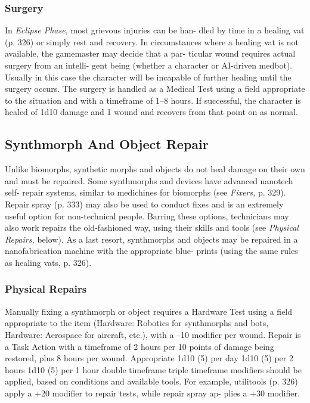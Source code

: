 \subsubsection{Surgery}

In \textit{Eclipse Phase,} most grievous injuries can be han-
dled by time in a healing vat (p. 326) or simply rest 
and recovery. In circumstances where a healing vat is 
not available, the gamemaster may decide that a par-
ticular wound requires actual surgery from an intelli-
gent being (whether a character or AI-driven medbot). 
Usually in this case the character will be incapable of 
further healing until the surgery occurs. The surgery 
is handled as a Medical Test using a field appropriate 
to the situation and with a timeframe of 1–8 hours. If 
successful, the character is healed of 1d10 damage and 
1 wound and recovers from that point on as normal.

\subsection{Synthmorph And Object Repair}

Unlike biomorphs, synthetic morphs and objects do not 
heal damage on their own and must be repaired. Some 
synthmorphs and devices have advanced nanotech self-
repair systems, similar to medichines for biomorphs (see 
\textit{Fixers,} p. 329). Repair spray (p. 333) may also be used 
to conduct fixes and is an extremely useful option for 
non-technical people. Barring these options, technicians 
may also work repairs the old-fashioned way, using 
their skills and tools (see \textit{Physical Repairs,} below). As a 
last resort, synthmorphs and objects may be repaired in 
a nanofabrication machine with the appropriate blue-
prints (using the same rules as healing vats, p. 326).

\subsubsection{Physical Repairs}

Manually fixing a synthmorph or object requires a 
Hardware Test using a field appropriate to the item 
(Hardware: Robotics for synthmorphs and bots, 
Hardware: Aerospace for aircraft, etc.), with a –10 
modifier per wound. Repair is a Task Action with 
a timeframe of 2 hours per 10 points of damage 
being restored, plus 8 hours per wound. Appropriate 
1d10 (5) per day
1d10 (5) per 2 hours
1d10 (5) per 1 hour
double timeframe
triple timeframe
modifiers should be applied, based on conditions and 
available tools. For example, utilitools (p. 326) apply 
a +20 modifier to repair tests, while repair spray ap-
plies a +30 modifier.


